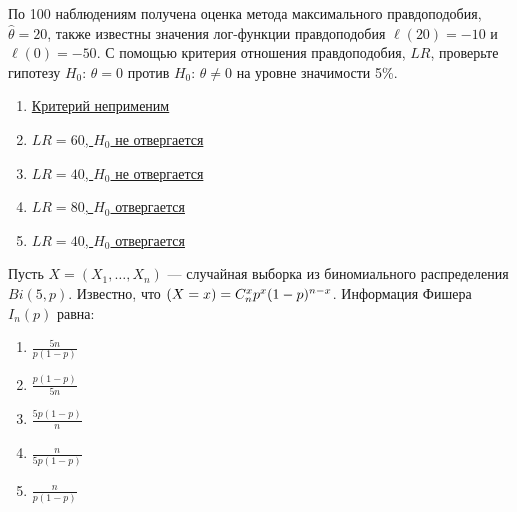 \documentclass[t]{beamer}
\let\P\relax
\DeclareMathOperator{\P}{\mathbb{P}}
\begin{document}
 \begin{frame} \label{39} 
\begin{block}{39} 

  По 100 наблюдениям получена оценка метода максимального правдоподобия, $\hat\theta = 20$, также известны значения лог-функции правдоподобия $\ell(20) = -10$ и $\ell(0)= - 50$. С помощью критерия отношения правдоподобия, $LR$, проверьте гипотезу $H_0$: $\theta = 0$ против $H_0$: $\theta \neq 0$ на уровне значимости 5\%.
  


 \end{block} 
\begin{enumerate} 
\item[] \hyperlink{39-No}{\beamergotobutton{} Критерий неприменим}
\item[] \hyperlink{39-No}{\beamergotobutton{} $LR = 60$, $H_0$ не отвергается}
\item[] \hyperlink{39-No}{\beamergotobutton{} $LR = 40$, $H_0$ не отвергается}
\item[] \hyperlink{39-Yes}{\beamergotobutton{} $LR = 80$, $H_0$ отвергается }
\item[] \hyperlink{39-No}{\beamergotobutton{} $LR = 40$, $H_0$  отвергается}
\end{enumerate} 
\end{frame} 


 \begin{frame} \label{40} 
\begin{block}{40} 

Пусть $X = (X_1, \ldots , X_n)$ — случайная выборка из биномиального распределения $Bi(5, p)$. Известно, что $\P(X = x) =C_n^x p^x(1-p)^{n-x} $. Информация Фишера $I_n(p)$ равна:
  


 \end{block} 
\begin{enumerate} 
\item[] \hyperlink{40-Yes}{\beamergotobutton{} $\frac{5n}{p(1-p)}$}
\item[] \hyperlink{40-No}{\beamergotobutton{} $\frac{p(1-p)}{5n}$}
\item[] \hyperlink{40-No}{\beamergotobutton{} $\frac{5p(1-p)}{n}$}
\item[] \hyperlink{40-No}{\beamergotobutton{}$\frac{n}{5p(1-p)}$}
\item[] \hyperlink{40-No}{\beamergotobutton{} $\frac{n}{p(1-p)}$}
\end{enumerate} 
\end{frame} 
\end{document}
